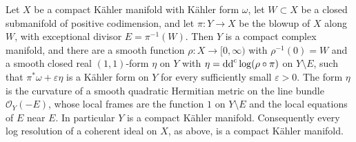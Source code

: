 \begin{proposition}\label{prop:kahler-smooth-center-blowup}
Let $X$ be a compact K\"ahler manifold with K\"ahler form $\omega$, let $W\subset X$ be a closed submanifold of positive codimension, and let $\pi\colon Y\to X$ be the blowup of $X$ along $W$, with exceptional divisor $E=\pi^{-1}(W)$. Then $Y$ is a compact complex manifold, and there are a smooth function $\rho\colon X\to[0,\infty)$ with $\rho^{-1}(0)=W$ and a smooth closed real $(1,1)$-form $\eta$ on $Y$ with $\eta=\mathrm{dd}^{\mathrm{c}}\log(\rho\circ\pi)$ on $Y\setminus E$, such that $\pi^*\omega+\varepsilon\eta$ is a K\"ahler form on $Y$ for every sufficiently small $\varepsilon>0$. The form $\eta$ is the curvature of a smooth quadratic Hermitian metric on the line bundle $\mathcal O_Y(-E)$, whose local frames are the function $1$ on $Y\setminus E$ and the local equations of $E$ near $E$. In particular $Y$ is a compact K\"ahler manifold. Consequently every log resolution of a coherent ideal on $X$, as above, is a compact K\"ahler manifold.
\end{proposition}
